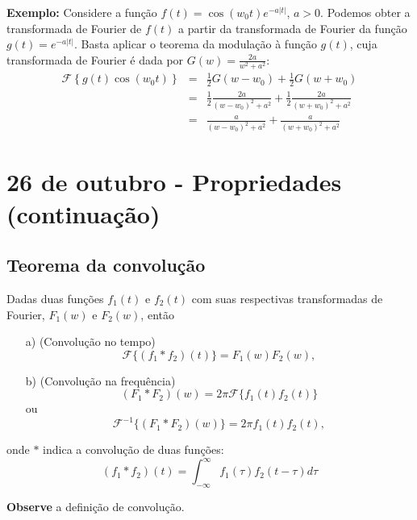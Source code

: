 \documentclass[a4paper,10pt]{book}
\begin{document}
{\bf Exemplo:} Considere a função $f(t)=\cos(w_0t) e^{-a|t|}$, $a>0$. Podemos obter a transformada de Fourier de $f(t)$ a partir da transformada de Fourier da função $g(t)=e^{-a|t|}$. Basta aplicar o teorema da modulação à função $g(t)$, cuja transformada de Fourier é dada por $G(w)=\frac{2a}{w^2+a^2}$:
 \begin{eqnarray*}
 \mathcal{F}\left\{g(t)\cos(w_0t) \right\}&=&\frac{1}{2}G(w-w_0)+\frac{1}{2}G(w+w_0)\\
 &=&\frac{1}{2}\frac{2a}{(w-w_0)^2+a^2}+\frac{1}{2}\frac{2a}{(w+w_0)^2+a^2}\\
 &=&\frac{a}{(w-w_0)^2+a^2}+\frac{a}{(w+w_0)^2+a^2}
 \end{eqnarray*}

 \chapter{26 de outubro - Propriedades (continuação)}
\section{Teorema da convolução}
Dadas duas funções $f_1(t)$ e $f_2(t)$ com suas respectivas transformadas de Fourier, $F_1(w)$ e $F_2(w)$, então
 \begin{itemize}
 \item[a)] (Convolução no tempo)
 \begin{equation}\mathcal{F}\{(f_1*f_2)(t)\}=F_1(w)F_2(w),\end{equation}
 \item[b)] (Convolução na frequência)
 \begin{equation}(F_1*F_2)(w)=2\pi\mathcal{F}\{f_1(t)f_2(t)\}\end{equation}
 ou 
 \begin{equation}\mathcal{F}^{-1}\{(F_1*F_2)(w)\}=2\pi f_1(t)f_2(t),\end{equation}
 \end{itemize}
 onde $*$ indica a convolução de duas funções:
 \begin{equation}
 (f_1*f_2)(t)=\int_{-\infty}^\infty f_1(\tau)f_2(t-\tau)d\tau
 \end{equation}

 {\bf Observe} a definição de convolução.
 
\end{document}
